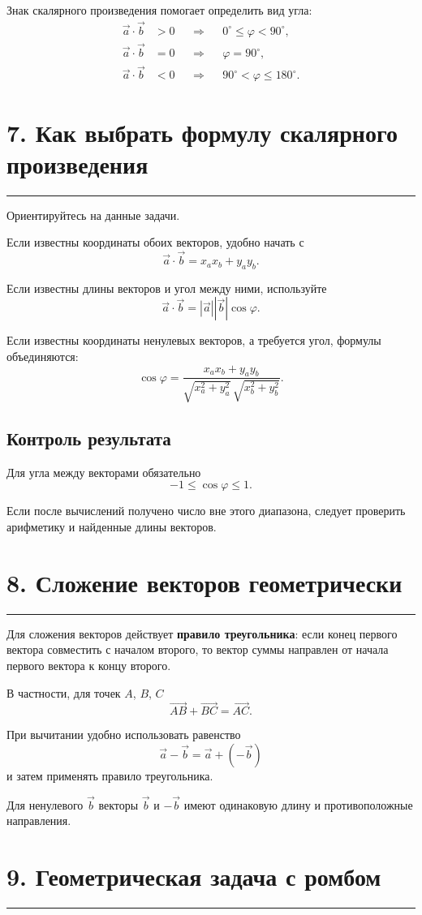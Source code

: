 \documentclass[a4paper,12pt]{article}
\newcommand{\vect}[1]{\overrightarrow{#1}}
\newcommand{\vct}[1]{\vec{#1}}
\newcommand{\modv}[1]{\left|#1\right|}
\newcommand{\sectionline}{%
    \vspace{0.1em}
    {\color{accent}\rule{\linewidth}{0.6pt}}
    \vspace{0.3em}
}
\newcommand{\topic}[1]{%
    \Needspace{7\baselineskip}%
    \section*{\color{darkaccent}#1}
    \sectionline
}
\begin{document}
Знак скалярного произведения помогает определить вид угла:
\[
\begin{aligned}
\vct a\cdot\vct b&>0
&&\Longrightarrow&&
0^\circ\le\varphi<90^\circ,\\
\vct a\cdot\vct b&=0
&&\Longrightarrow&&
\varphi=90^\circ,\\
\vct a\cdot\vct b&<0
&&\Longrightarrow&&
90^\circ<\varphi\le180^\circ.
\end{aligned}
\]

\topic{7. Как выбрать формулу скалярного произведения}

Ориентируйтесь на данные задачи.

Если известны координаты обоих векторов, удобно начать с
\[
\vct a\cdot\vct b=x_ax_b+y_ay_b.
\]

Если известны длины векторов и угол между ними, используйте
\[
\vct a\cdot\vct b
=
\modv{\vct a}\modv{\vct b}\cos\varphi.
\]

Если известны координаты ненулевых векторов, а требуется угол, формулы объединяются:
\[
\boxed{
\cos\varphi
=
\frac{x_ax_b+y_ay_b}
{\sqrt{x_a^2+y_a^2}\,\sqrt{x_b^2+y_b^2}}
}.
\]

\subsection*{\color{darkaccent}Контроль результата}

Для угла между векторами обязательно
\[
-1\le\cos\varphi\le1.
\]

Если после вычислений получено число вне этого диапазона, следует проверить арифметику и найденные длины векторов.

\topic{8. Сложение векторов геометрически}

Для сложения векторов действует \textbf{правило треугольника}: если конец первого вектора совместить с началом второго, то вектор суммы направлен от начала первого вектора к концу второго.

В частности, для точек \(A\), \(B\), \(C\)
\[
\boxed{
\vect{AB}+\vect{BC}=\vect{AC}
}.
\]

При вычитании удобно использовать равенство
\[
\vct a-\vct b=\vct a+(-\vct b)
\]
и затем применять правило треугольника.

Для ненулевого \(\vct b\) векторы \(\vct b\) и \(-\vct b\) имеют одинаковую длину и противоположные направления.

\topic{9. Геометрическая задача с ромбом}
\end{document}
